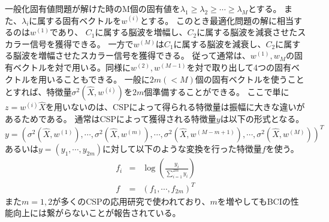 一般化固有値問題が解けた時のM個の固有値を\(\lambda_1 \geq \lambda_2 \geq \cdots \geq \lambda_M\)とする。
また、\(\lambda_i\)に属する固有ベクトルを\(w^{(i)}\)とする。
このとき最適化問題の解に相当するのは\(w^{(1)}\)であり、
\(C_1\)に属する脳波を増幅し、\(C_2\)に属する脳波を減衰させたスカラー信号を獲得できる。
一方で\(w^{(M)}\)は\(C_1\)に属する脳波を減衰し、\(C_2\)に属する脳波を増幅させたスカラー信号を獲得できる。
従って通常は、\(w^{(1)},w_M\)の固有ベクトルを対で用いる。同様に\(w^{(2)},w^{(M-1)}\)を対で取り出して4つの固有ベクトルを用いることもできる。
一般に\(2m(<M)\)個の固有ベクトルを使うこととすれば、特徴量\(\sigma^2(\hat X,w^{(i)})\)を\(2m\)個準備することができる。
ここで単に\(z=w^{(i)}\hat X\)を用いないのは、CSPによって得られる特徴量は振幅に大きな違いがあるためである。
通常はCSPによって獲得される特徴量\(y\)は以下の形式となる。
\begin{equation}
    y = (\sigma^2(\hat X,w^{(1)}), \cdots, \sigma^2(\hat X,w^{(m)}), \cdots, \sigma^2(\hat X,w^{(M-m+1)}), \cdots, \sigma^2(\hat X,w^{(M)}))^T
\end{equation}
あるいは\(y=(y_1, \cdots, y_{2m})\)に対して以下のような変換を行った特徴量\(f\)を使う。
\begin{eqnarray}
    f_i &=& \log \left( \frac{y_i}{\sum_{i=1}^{2m}y_i} \right) \nonumber \\
    f &=& (f_1, \cdots, f_{2m})^T 
\end{eqnarray}
また\(m=1,2\)が多くのCSPの応用研究で使われており、\(m\)を増やしてもBCIの性能向上には繋がらないことが報告されている\cite{cvscsp}。

